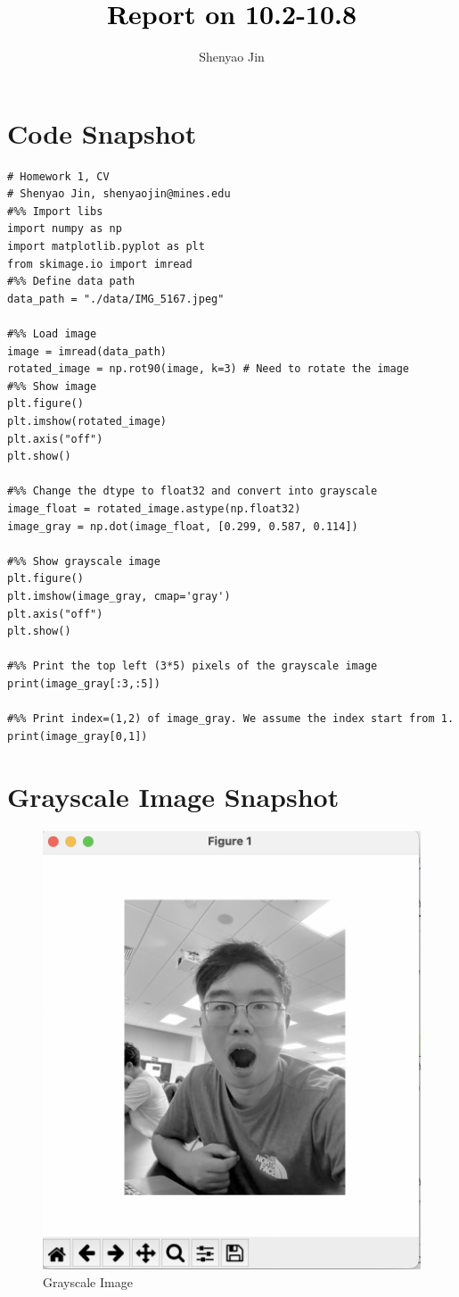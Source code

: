 \documentclass[journal]{IEEEtran}
\begin{document}
\title{\textcolor{black}{Report on 10.2-10.8}}      

\author{Shenyao Jin} 


\maketitle


\section{Code Snapshot}
\begin{verbatim}
# Homework 1, CV
# Shenyao Jin, shenyaojin@mines.edu
#%% Import libs
import numpy as np
import matplotlib.pyplot as plt
from skimage.io import imread
#%% Define data path
data_path = "./data/IMG_5167.jpeg"

#%% Load image
image = imread(data_path)
rotated_image = np.rot90(image, k=3) # Need to rotate the image
#%% Show image
plt.figure()
plt.imshow(rotated_image)
plt.axis("off")
plt.show()

#%% Change the dtype to float32 and convert into grayscale
image_float = rotated_image.astype(np.float32)
image_gray = np.dot(image_float, [0.299, 0.587, 0.114])

#%% Show grayscale image
plt.figure()
plt.imshow(image_gray, cmap='gray')
plt.axis("off")
plt.show()

#%% Print the top left (3*5) pixels of the grayscale image
print(image_gray[:3,:5])

#%% Print index=(1,2) of image_gray. We assume the index start from 1.
print(image_gray[0,1])
\end{verbatim}

\section{Grayscale Image Snapshot}
\begin{figure}[h]
    \centering
    \includegraphics[width=0.8\columnwidth]{../data/gray_scale_figure.png}
    \caption{Grayscale Image}
\end{figure}
\end{document}
